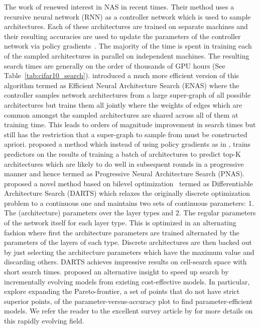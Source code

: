 The work of \citep{nas,NASCell} renewed interest in NAS in recent times. Their method uses a recursive neural network (RNN) as a controller network which is used to sample architectures. Each of these architectures are trained on separate machines and their resulting accuracies are used to update the parameters of the controller network via policy gradients~\citep{policygradient}. The majority of the time is spent in training each of the sampled architectures in parallel on independent machines. The resulting search times are generally on the order of thousands of GPU hours (See Table~\ref{tab:cifar10_search}). \cite{Pham2018EfficientNA} introduced a much more efficient version of this algorithm termed as Efficient Neural Architecture Search (ENAS) where the controller samples network architectures from a large super-graph of all possible architectures but trains them all jointly where the weights of edges which are common amongst the sampled architectures are shared across all of them at training time. This leads to orders of magnitude improvement in search times but still has the restriction that a super-graph to sample from must be constructed apriori.
\cite{Liu2017ProgressiveNA} proposed a method which instead of using policy gradients as in \cite{NASCell}, trains predictors on the results of training a batch of architectures to predict top-K architectures which are likely to do well in subsequent rounds in a progressive manner and hence termed as Progressive Neural Architecture Search (PNAS). 
\cite{Liu2018DARTSDA} proposed a novel method based on bilevel optimization~\citep{bilevel_opt} termed as Differentiable Architecture Search (DARTS) which relaxes the originally discrete optimization problem to a continuous one and maintains two sets of continuous parameters: 1. The (architecture) parameters over the layer types and 2. The regular parameters of the network itself for each layer type. This is optimized in an alternating fashion where first the architecture parameters are trained alternated by the parameters of the layers of each type. Discrete architectures are then backed out by just selecting the architecture parameters which have the maximum value and discarding others. DARTS achieves impressive results on cell-search space with short search times.
\cite{Elsken2018EfficientMN, CaiPathLevel} proposed an alternative insight to speed up search by incrementally evolving models from existing cost-effective models. In particular,~\cite{Elsken2018EfficientMN} explore expanding the Pareto-frontier, a set of points that do not have strict superior points, of the parameter-versus-accuracy plot to find parameter-efficient models. We refer the reader to the excellent survey article by \cite{Elsken2018NeuralAS} for more details on this rapidly evolving field. 

